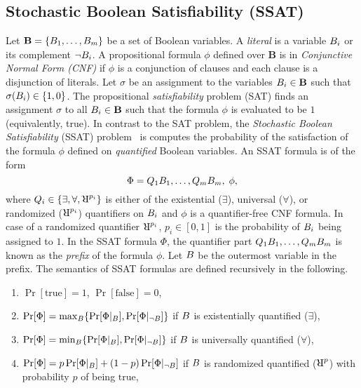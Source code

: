 \subsection{Stochastic Boolean Satisfiability (SSAT)}\label{fairness_justicia_sec:ssat}
Let $\mathbf{B}  = \{B_1, \dots, B_m\}  $ be a set of Boolean variables. A \textit{literal} is a variable $ B_i $ or its complement $ \neg B_i $. 
A propositional formula $\phi$ defined over $\mathbf{B}$ is in \textit{Conjunctive Normal Form (CNF)} if $\phi$   is  a conjunction of clauses and each clause is a disjunction of literals. 
Let $ \sigma $ be an assignment to the  variables $ B_i \in \mathbf{B} $  such that $ \sigma(B_i) \in \{1, 0\} $. The propositional  \textit{satisfiability} problem (SAT) finds an assignment $ \sigma $ to all $ B_i \in  \mathbf{B} $ such that the formula $ \phi $ is evaluated to be $1$ (equivalently, true). 
In contrast to the SAT problem, the \textit{Stochastic Boolean Satisfiability} (SSAT) problem~\cite{littman2001stochastic} is computes the  probability of the satisfaction of the formula $\phi$ defined on \textit{quantified} Boolean variables. 
An SSAT formula is of the form
\begin{equation}\label{fairness_justicia_eq:ssat}
\Phi = Q_1B_1, \dots, Q_m B_m,\; \phi, 
\end{equation}
where $ Q_i \in \{\exists, \forall, \R^{p_i}\} $ is either of the existential ($\exists$), universal ($\forall$), or randomized ($\R^{p_i}$) quantifiers on $B_i$ and $\phi$ is a quantifier-free CNF formula. In case of a randomized quantifier $ \R^{p_i} $, $ p_i \in [0,1] $ is the probability of $ B_i $ being assigned to $ 1 $. In the SSAT formula $ \Phi $, the quantifier part $ Q_1B_1, \dots, Q_m B_m $ is known as the \textit{prefix} of the formula $ \phi $.  Let $ B $ be the outermost variable in the prefix. The semantics of SSAT formulas are defined recursively in the following.
\begin{enumerate}
	\item $ \Pr[\text{true}] = 1 $,  $ \Pr[\text{false}] = 0 $, 
	\item $ \Pr [\Phi] = \max_{B} \{\Pr[\Phi|_{B}], \Pr[\Phi|_{\neg B}]\}$ if $ B $ is existentially quantified ($ \exists $), 
	\item $ \Pr [\Phi] = \min_{B} \{\Pr[\Phi|_{B}], \Pr[\Phi|_{\neg B}]\} $ if $ B $ is universally quantified ($ \forall $), 
	\item $ \Pr [\Phi] = p\Pr[\Phi|_{B}] + (1-p) \Pr[\Phi|_{\neg B}] $ if $ B $ is randomized quantified ($\R^{p}$) with probability $p$ of being $\text{true}$,
\end{enumerate}
